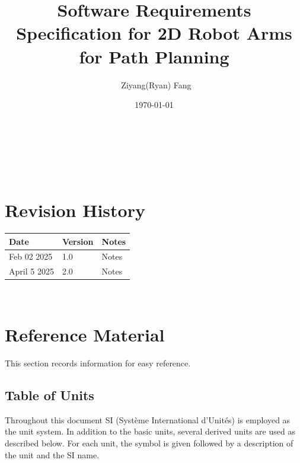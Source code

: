 \documentclass[12pt]{article}
\providecommand{\DIFaddbegin}{} %
\providecommand{\DIFaddend}{} %
\newcommand{\DIFaddincludegraphics}[2][]{{\color{blue}\fbox{\DIFOincludegraphics[#1]{#2}}}} %
\DeclareRobustCommand{\DIFaddbegin}{\DIFOaddbegin \let\includegraphics\DIFaddincludegraphics} %
\DeclareRobustCommand{\DIFaddend}{\DIFOaddend \let\includegraphics\DIFOincludegraphics} %
\begin{document}
\title{Software Requirements Specification for 2D Robot Arms for Path Planning} 
\author{\ Ziyang(Ryan) Fang}
\date{\today}

\maketitle

~\newpage


\tableofcontents

~\newpage

\section*{Revision History}

\begin{tabularx}{\textwidth}{p{3cm}p{2cm}X}
  \toprule
  {\bf Date} & {\bf Version} & {\bf Notes} \\
  \midrule
  Feb 02 2025 & 1.0 & Notes \\
  \DIFaddbegin
  April 5 2025 & 2.0 & Notes \\
  \DIFaddend
  \bottomrule
\end{tabularx}




~\newpage

\section{Reference Material}

This section records information for easy reference.

\subsection{Table of Units}

Throughout this document SI (Syst\`{e}me International d'Unit\'{e}s) is employed
as the unit system.  In addition to the basic units, several derived units are
used as described below.  For each unit, the symbol is given followed by a
description of the unit and the SI name.
~\newline
\end{document}
